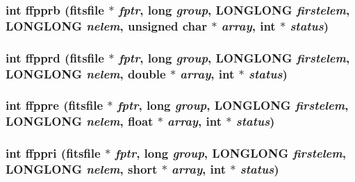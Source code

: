 \subsubsection{\setlength{\rightskip}{0pt plus 5cm}int ffpprb (\bf{fitsfile} $\ast$ {\em fptr}, long {\em group}, \bf{LONGLONG} {\em firstelem}, \bf{LONGLONG} {\em nelem}, unsigned char $\ast$ {\em array}, int $\ast$ {\em status})}\label{test_2shm__client_2fitsio_8h_edd9b7d590d4caaf22a5a02f2123e981}


\subsubsection{\setlength{\rightskip}{0pt plus 5cm}int ffpprd (\bf{fitsfile} $\ast$ {\em fptr}, long {\em group}, \bf{LONGLONG} {\em firstelem}, \bf{LONGLONG} {\em nelem}, double $\ast$ {\em array}, int $\ast$ {\em status})}\label{test_2shm__client_2fitsio_8h_bcb9e32598b5c68125623cc6ad18adf5}


\subsubsection{\setlength{\rightskip}{0pt plus 5cm}int ffppre (\bf{fitsfile} $\ast$ {\em fptr}, long {\em group}, \bf{LONGLONG} {\em firstelem}, \bf{LONGLONG} {\em nelem}, float $\ast$ {\em array}, int $\ast$ {\em status})}\label{test_2shm__client_2fitsio_8h_a7ad2029b3f043c3e909413184e5ce2f}


\subsubsection{\setlength{\rightskip}{0pt plus 5cm}int ffppri (\bf{fitsfile} $\ast$ {\em fptr}, long {\em group}, \bf{LONGLONG} {\em firstelem}, \bf{LONGLONG} {\em nelem}, short $\ast$ {\em array}, int $\ast$ {\em status})}\label{test_2shm__client_2fitsio_8h_08d9b16056155823102497a507020ba4}


